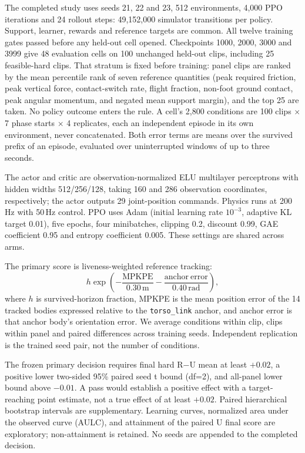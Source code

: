 \documentclass[letterpaper,10pt,conference]{ieeeconf}
\begin{document}
The completed study uses seeds 21, 22 and 23, 512 environments, 4,000 PPO iterations and
24 rollout steps: 49,152,000 simulator transitions per policy. Support, learner, rewards
and reference targets are common. All twelve training gates passed before any held-out
cell opened. Checkpoints 1000, 2000, 3000 and 3999 give 48 evaluation cells on 100 unchanged
held-out clips, including 25 feasible-hard clips. That stratum is fixed before training: panel
clips are ranked by the mean percentile rank of seven reference quantities (peak required
friction, peak vertical force, contact-switch rate, flight fraction, non-foot ground contact,
peak angular momentum, and negated mean support margin), and the top 25 are taken. No policy
outcome enters the rule. A cell's 2,800 conditions are 100 clips $\times$ 7 phase starts
$\times$ 4 replicates, each an independent episode in its own environment, never concatenated.
Both error terms are means over the survived prefix of an episode, evaluated over uninterrupted
windows of up to three seconds.

The actor and critic are observation-normalized ELU multilayer perceptrons with
hidden widths 512/256/128, taking 160 and 286 observation coordinates, respectively;
the actor outputs 29 joint-position commands. Physics runs at 200\,Hz with 50\,Hz
control. PPO uses Adam (initial learning rate $10^{-3}$, adaptive KL target 0.01),
five epochs, four minibatches, clipping 0.2, discount 0.99, GAE coefficient 0.95
and entropy coefficient 0.005. These settings are shared across arms.

The primary score is liveness-weighted reference tracking:
\begin{equation}
h\exp\!\left(-\frac{\mathrm{MPKPE}}{0.30\,\mathrm{m}}
             -\frac{\mathrm{anchor\ error}}{0.40\,\mathrm{rad}}\right),
\end{equation}
where $h$ is survived-horizon fraction, MPKPE is the mean position error of the 14 tracked
bodies expressed relative to the \texttt{torso\_link} anchor, and anchor error is that anchor
body's orientation error. We average conditions within clip, clips within
panel and paired differences across training seeds. Independent replication is the
trained seed pair, not the number of conditions.

The frozen primary decision requires final hard R$-$U mean at least $+0.02$, a positive
lower two-sided 95\% paired seed t bound (df=2), and all-panel lower bound above $-0.01$.
A pass would establish a positive effect with a target-reaching point estimate, not a
true effect of at least $+0.02$. Paired hierarchical bootstrap intervals are supplementary.
Learning curves, normalized area under the observed curve (AULC), and attainment of the
paired U final score are exploratory; non-attainment is retained. No seeds are appended
to the completed decision.
\end{document}
